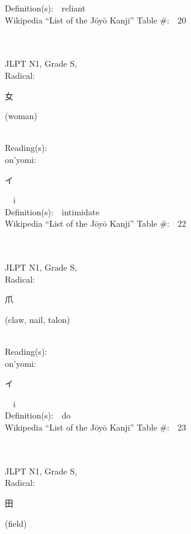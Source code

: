 \begin{multicols}{2}
Definition(s):\ \ reliant \\
Wikipedia ``List of the J\=oy\=o Kanji'' Table \#:\ \ 20 \\
\ \ \\
{\fontsize{34pt}{40pt}  }\ \ \\
{JLPT N1, Grade S, \\Radical:\ \ {\begin{CJK}{UTF8}{min} 女 \end{CJK}} (woman) } \\
Reading(s):\ \ \\
{\hspace*{1em}}on'yomi:\ \ \\
{\hspace*{2em}}{\begin{CJK}{UTF8}{min} イ \end{CJK}}\ \ i\ \ \\
Definition(s):\ \ intimidate \\
Wikipedia ``List of the J\=oy\=o Kanji'' Table \#:\ \     22 \\
\ \ \\
{\fontsize{34pt}{40pt}  }\ \ \\
{JLPT N1, Grade S, \\Radical:\ \ {\begin{CJK}{UTF8}{min} 爪 \end{CJK}} (claw, nail, talon) } \\
Reading(s):\ \ \\
{\hspace*{1em}}on'yomi:\ \ \\
{\hspace*{2em}}{\begin{CJK}{UTF8}{min} イ \end{CJK}}\ \ i\ \ \\
Definition(s):\ \ do \\
Wikipedia ``List of the J\=oy\=o Kanji'' Table \#:\ \     23 \\
\ \ \\
{\fontsize{34pt}{40pt}  }\ \ \\
{JLPT N1, Grade S, \\Radical:\ \ {\begin{CJK}{UTF8}{min} 田 \end{CJK}} (field) } \\

\end{multicols}
